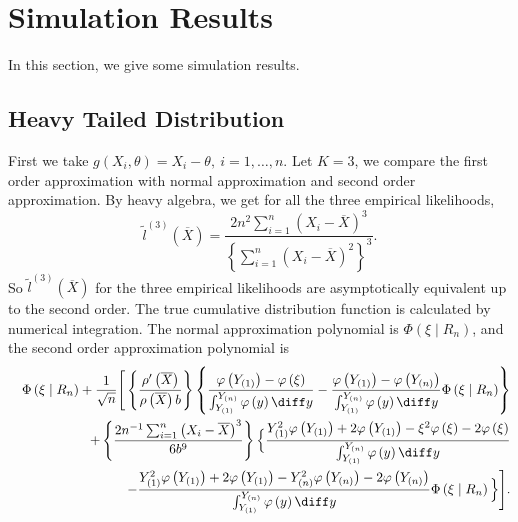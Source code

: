 \section{Simulation Results }


In this section, we give some simulation results. 

\subsection{{Heavy Tailed Distribution}}
{ First} we take $g\left(X_{i},\theta\right)=X_{i}-\theta,\: i=1,\ldots,n$.
Let $K=3$, we compare the first order approximation with normal approximation
and second order approximation. By heavy algebra, we get for all the
three empirical likelihoods, 
\[
\tilde{l}^{\left(3\right)}\left(\overline{X}\right)=\frac{2n^{2}\sum_{i=1}^{n}\left(X_{i}-\overline{X}\right)^{3}}{\left\{ \sum_{i=1}^{n}\left(X_{i}-\overline{X}\right)^{2}\right\} ^{3}}.
\]
So  $\tilde{l}^{\left(3\right)}\left(\overline{X}\right)$ for
the three empirical likelihoods are asymptotically equivalent up to
the second order. The true cumulative distribution function is calculated
by numerical integration. The normal approximation polynomial
is $\Phi\left(\xi\mid R_{n}\right)$, and the second order approximation
polynomial is 
\begin{eqnarray*}
 &  & \Phi\left(\xi\mid R_{n}\right)+\frac{1}{\sqrt{n}}\Bigg[\left\{ \frac{\rho'\left(\overline{X}\right)}{\rho\left(\overline{X}\right)b}\right\} \left\{ \frac{\varphi\left(Y_{\left(1\right)}\right)-\varphi\left(\xi\right)}{\int_{Y_{\left(1\right)}}^{Y_{\left(n\right)}}\varphi\left(y\right)\diff y}-\frac{\varphi\left(Y_{\left(1\right)}\right)-\varphi\left(Y_{\left(n\right)}\right)}{\int_{Y_{\left(1\right)}}^{Y_{\left(n\right)}}\varphi\left(y\right)\diff y}\Phi\left(\xi\mid R_{n}\right)\right\} \\
 &  & +\left\{ \frac{2n^{-1}\sum_{i=1}^{n}\left(X_{i}-\overline{X}\right)^{3}}{6b^{9}}\right\} \Big\{\frac{Y_{\left(1\right)}^{2}\varphi\left(Y_{\left(1\right)}\right)+2\varphi\left(Y_{\left(1\right)}\right)-\xi^{2}\varphi\left(\xi\right)-2\varphi\left(\xi\right)}{\int_{Y_{\left(1\right)}}^{Y_{\left(n\right)}}\varphi\left(y\right)\diff y}\\
 &  & -\frac{Y_{\left(1\right)}^{2}\varphi\left(Y_{\left(1\right)}\right)+2\varphi\left(Y_{\left(1\right)}\right)-Y_{\left(n\right)}^{2}\varphi\left(Y_{\left(n\right)}\right)-2\varphi\left(Y_{\left(n\right)}\right)}{\int_{Y_{\left(1\right)}}^{Y_{\left(n\right)}}\varphi\left(y\right)\diff y}\Phi\left(\xi\mid R_{n}\right)\Big\}\Bigg].
\end{eqnarray*}
